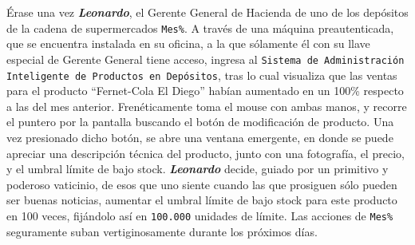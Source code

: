 Érase una vez \textbf{\emph{Leonardo}}, el Gerente General de Hacienda de uno
de los depósitos de la cadena de supermercados \texttt{Mes\%}. A través de una
máquina preautenticada, que se encuentra instalada en su oficina, a la que
sólamente él con su llave especial de Gerente General tiene acceso, ingresa al
\texttt{Sistema de Administración Inteligente de Productos en Depósitos}, tras
lo cual visualiza que las ventas para el producto ``Fernet-Cola El Diego''
habían aumentado en un 100\% respecto a las del mes anterior. Frenéticamente
toma el mouse con ambas manos, y recorre el puntero por la pantalla buscando
el botón de modificación de producto. Una vez presionado dicho botón, se abre
una ventana emergente, en donde se puede apreciar una descripción técnica del
producto, junto con una fotografía, el precio, y el umbral límite de bajo
stock. \textbf{\emph{Leonardo}} decide, guiado por un primitivo y poderoso
vaticinio, de esos que uno siente cuando las que prosiguen sólo pueden ser
buenas noticias, aumentar el umbral límite de bajo stock para este producto en
100 veces, fijándolo así en \texttt{100.000} unidades de límite. Las acciones
de \texttt{Mes\%} seguramente suban vertiginosamente durante los próximos
días.